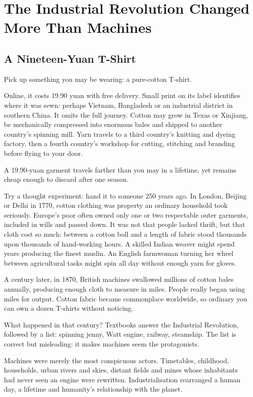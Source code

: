 \chapter[More Than Machines]{The Industrial Revolution Changed More Than Machines}
\section{A Nineteen-Yuan T-Shirt}
Pick up something you may be wearing: a pure-cotton T-shirt.

Online, it costs 19.90 yuan with free delivery. Small print on its label identifies where it was sewn: perhaps Vietnam, Bangladesh or an industrial district in southern China. It omits the full journey. Cotton may grow in Texas or Xinjiang, be mechanically compressed into enormous bales and shipped to another country's spinning mill. Yarn travels to a third country's knitting and dyeing factory, then a fourth country's workshop for cutting, stitching and branding before flying to your door.

A 19.90-yuan garment travels farther than you may in a lifetime, yet remains cheap enough to discard after one season.

Try a thought experiment: hand it to someone 250 years ago. In London, Beijing or Delhi in 1770, cotton clothing was property an ordinary household took seriously. Europe's poor often owned only one or two respectable outer garments, included in wills and passed down. It was not that people lacked thrift, but that cloth cost so much: between a cotton boll and a length of fabric stood thousands upon thousands of hand-working hours. A skilled Indian weaver might spend years producing the finest muslin. An English farmwoman turning her wheel between agricultural tasks might spin all day without enough yarn for gloves.

A century later, in 1870, British machines swallowed millions of cotton bales annually, producing enough cloth to measure in miles. People really began using miles for output. Cotton fabric became commonplace worldwide, so ordinary you can own a dozen T-shirts without noticing.

What happened in that century? Textbooks answer the Industrial Revolution, followed by a list: spinning jenny, Watt engine, railway, steamship. The list is correct but misleading: it makes machines seem the protagonists.

Machines were merely the most conspicuous actors. Timetables, childhood, households, urban rivers and skies, distant fields and mines whose inhabitants had never seen an engine were rewritten. Industrialisation rearranged a human day, a lifetime and humanity's relationship with the planet.

